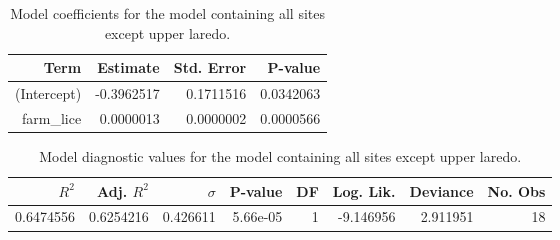 \begin{table}
\centering
\caption{Model coefficients for the model containing all sites except
    upper laredo.}
\centering
\begin{tabular}[t]{rrrr}
\toprule
Term & Estimate & Std. Error & P-value\\
\midrule
(Intercept) & -0.3962517 & 0.1711516 & 0.0342063\\
farm\_lice & 0.0000013 & 0.0000002 & 0.0000566\\
\bottomrule
\end{tabular}
\end{table}

\begin{table}
\centering
\caption{Model diagnostic values for the model containing all sites
    except upper laredo.}
\centering
\begin{tabular}[t]{rrrrrrrr}
\toprule
$R^2$ & Adj. $R^2$ & $\sigma$ & P-value & DF & Log. Lik. & Deviance & No. Obs\\
\midrule
0.6474556 & 0.6254216 & 0.426611 & 5.66e-05 & 1 & -9.146956 & 2.911951 & 18\\
\bottomrule
\end{tabular}
\end{table}
